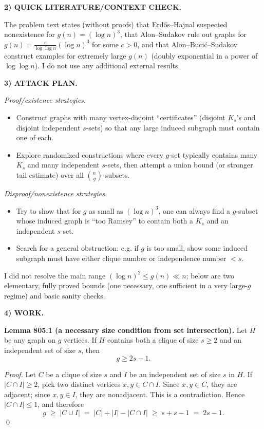 \medskip
\noindent\textbf{2) QUICK LITERATURE/CONTEXT CHECK.}

The problem text states (without proofs) that Erd\H{o}s--Hajnal suspected nonexistence for $g(n)=(\log n)^3$, that Alon--Sudakov rule out graphs for $g(n)=\frac{c}{\log\log n}(\log n)^3$ for some $c>0$, and that Alon--Buci\'c--Sudakov construct examples for extremely large $g(n)$ (doubly exponential in a power of $\log\log n$). I do not use any additional external results.

\medskip
\noindent\textbf{3) ATTACK PLAN.}

\emph{Proof/existence strategies.}
\begin{itemize}
\item Construct graphs with many vertex-disjoint ``certificates'' (disjoint $K_s$'s and disjoint independent $s$-sets) so that any large induced subgraph must contain one of each.
\item Explore randomized constructions where every $g$-set typically contains many $K_s$ and many independent $s$-sets, then attempt a union bound (or stronger tail estimate) over all $\binom{n}{g}$ subsets.
\end{itemize}

\emph{Disproof/nonexistence strategies.}
\begin{itemize}
\item Try to show that for $g$ as small as $(\log n)^3$, one can always find a $g$-subset whose induced graph is ``too Ramsey'' to contain both a $K_s$ and an independent $s$-set.
\item Search for a general obstruction: e.g. if $g$ is too small, show some induced subgraph must have either clique number or independence number $<s$.
\end{itemize}

I did not resolve the main range $(\log n)^2\le g(n)\ll n$; below are two elementary, fully proved bounds (one necessary, one sufficient in a very large-$g$ regime) and basic sanity checks.

\medskip
\noindent\textbf{4) WORK.}

\textbf{Lemma 805.1 (a necessary size condition from set intersection).}
Let $H$ be any graph on $g$ vertices. If $H$ contains both a clique of size $s\ge 2$ and an independent set of size $s$, then
\[
 g\ge 2s-1.
\]

\emph{Proof.}
Let $C$ be a clique of size $s$ and $I$ be an independent set of size $s$ in $H$. If $|C\cap I|\ge 2$, pick two distinct vertices $x,y\in C\cap I$. Since $x,y\in C$, they are adjacent; since $x,y\in I$, they are nonadjacent. This is a contradiction. Hence $|C\cap I|\le 1$, and therefore
\[
 g\;\ge\;|C\cup I|\;=\;|C|+|I|-|C\cap I|\;\ge\; s+s-1\;=\;2s-1.
\]
\qed

